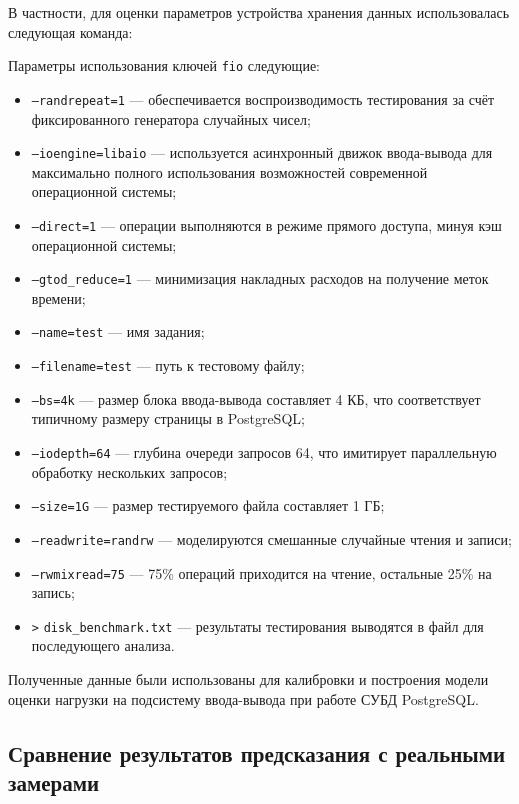 В частности, для оценки параметров устройства хранения данных использовалась следующая команда:


Параметры использования ключей {\tt fio} следующие:
\begin{itemize}
    \item \texttt{--randrepeat=1} --- обеспечивается воспроизводимость тестирования за счёт фиксированного генератора случайных чисел;
    \item \texttt{--ioengine=libaio} --- используется асинхронный движок ввода-вывода для максимально полного использования возможностей современной операционной системы;
    \item \texttt{--direct=1} --- операции выполняются в режиме прямого доступа, минуя кэш операционной системы;
    \item \texttt{--gtod\_reduce=1} --- минимизация накладных расходов на получение меток времени;
    \item \texttt{--name=test} --- имя задания;
    \item \texttt{--filename=test} --- путь к тестовому файлу;
    \item \texttt{--bs=4k} --- размер блока ввода-вывода составляет 4 КБ, что соответствует типичному размеру страницы в PostgreSQL;
    \item \texttt{--iodepth=64} --- глубина очереди запросов 64, что имитирует параллельную обработку нескольких запросов;
    \item \texttt{--size=1G} --- размер тестируемого файла составляет 1 ГБ;
    \item \texttt{--readwrite=randrw} --- моделируются смешанные случайные чтения и записи;
    \item \texttt{--rwmixread=75} --- 75\% операций приходится на чтение, остальные 25\% на запись;
    \item \texttt{>} \texttt{disk\_benchmark.txt} --- результаты тестирования выводятся в файл для последующего анализа.
\end{itemize}

Полученные данные были использованы для калибровки и построения модели оценки нагрузки на подсистему ввода-вывода при работе СУБД PostgreSQL.


\subsection{Сравнение результатов предсказания с реальными замерами}


